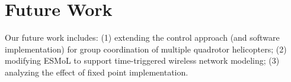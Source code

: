 \documentclass[10pt, conference, compsocconf]{IEEEtran}
\begin{document}
\section{Future Work}

Our future work includes: (1) extending the control approach (and software implementation) for group coordination of multiple quadrotor helicopters; (2) modifying ESMoL to support time-triggered wireless network modeling; (3) analyzing the effect of fixed point implementation.




\end{document}
